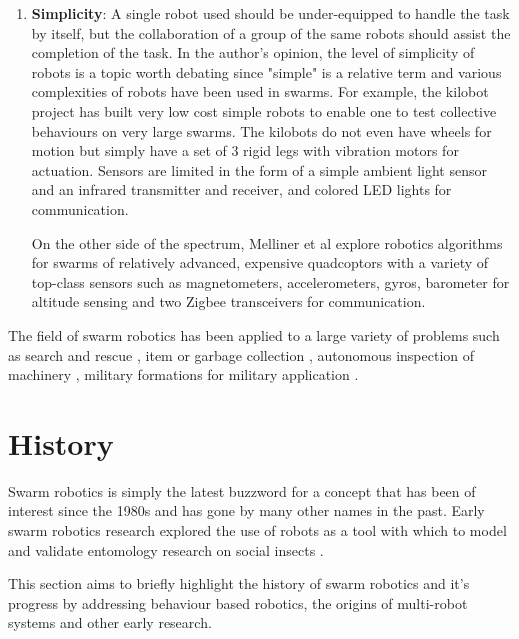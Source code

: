 \begin{enumerate}
\item \textbf{Simplicity}: A single robot used should be under-equipped to handle the task by itself, but the collaboration of a group of the same robots should assist the completion of the task. In the author's opinion, the level of simplicity of robots is a topic worth debating since "simple" is a relative term and various complexities of robots have been used in swarms. For example, the kilobot project \cite{rubenstein2012kilobot} has built very low cost simple robots to enable one to test collective behaviours on very large swarms. The kilobots do not even have wheels for motion but simply have a set of 3 rigid legs with vibration motors for actuation. Sensors are limited in the form of a simple ambient light sensor and an infrared transmitter and receiver, and colored LED lights for communication. 

On the other side of the spectrum, Melliner et al \cite{mellinger2013cooperative,kushleyev2013towards} explore robotics algorithms for swarms of relatively advanced, expensive quadcoptors with a variety of top-class sensors such as magnetometers, accelerometers, gyros, barometer for altitude sensing and two Zigbee transceivers for communication.
\end{enumerate}

 The field of swarm robotics has been applied to a large variety of problems such as search and rescue \cite{mondada2002search}, item or garbage collection \cite{balch1995io}, autonomous inspection of machinery \cite{correll2007challenging}, military formations for military application \cite{balch1998behavior}.



\section{History}
\label{history}
 
Swarm robotics is simply the latest buzzword for a concept that has been of interest since the 1980s and has gone by many other names in the past. Early swarm robotics research explored the use of robots as a tool with which to model and validate entomology research on social insects \cite{dorigo2014swarm, beni1993swarm, seeley2009wisdom}.

This section aims to briefly highlight the history of swarm robotics and it's progress by addressing behaviour based robotics, the origins of multi-robot systems and other early research.


